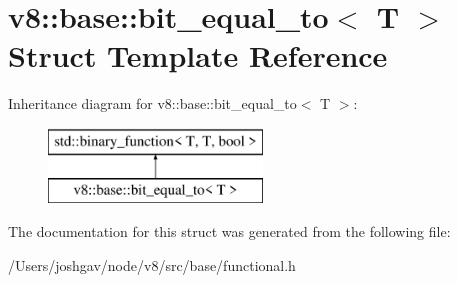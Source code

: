 \hypertarget{structv8_1_1base_1_1bit__equal__to}{}\section{v8\+:\+:base\+:\+:bit\+\_\+equal\+\_\+to$<$ T $>$ Struct Template Reference}
\label{structv8_1_1base_1_1bit__equal__to}
Inheritance diagram for v8\+:\+:base\+:\+:bit\+\_\+equal\+\_\+to$<$ T $>$\+:\begin{figure}[H]
\begin{center}
\leavevmode
\includegraphics[height=2.000000cm]{structv8_1_1base_1_1bit__equal__to}
\end{center}
\end{figure}


The documentation for this struct was generated from the following file\+:\begin{DoxyCompactItemize}
\item 
/\+Users/joshgav/node/v8/src/base/functional.\+h\end{DoxyCompactItemize}
